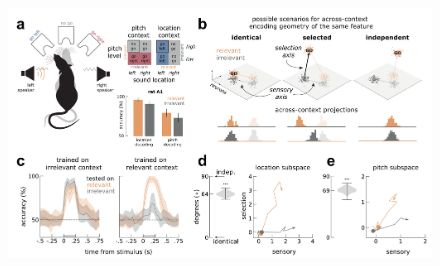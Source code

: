 \documentclass[12pt]{article}
\begin{document}
\begin{figure}
\centering
        \includegraphics[width=\textwidth]{figures/Fig1.pdf}

\end{figure}
\end{document}
